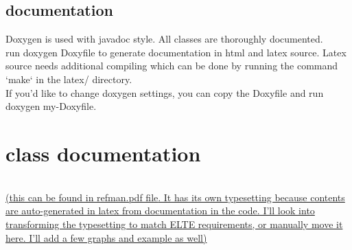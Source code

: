 \documentclass{elteikthesis}[2018/06/06]
\begin{document}
\subsection{documentation}
\label{sec-3-2-3}
Doxygen is used with javadoc style. All classes are thoroughly documented. \\
run doxygen Doxyfile to generate documentation in html and latex source. Latex source needs additional compiling which can be done by running the command `make` in the latex/ directory. \\
If you'd like to change doxygen settings, you can copy the Doxyfile and run doxygen my-Doxyfile. \\
\section{class documentation}
\label{sec-3-3}
\begin{center}
\begin{tabular}{}
\\
\\
\end{tabular}
\end{center}
\uline{(this can be found in \href{latex/refman.pdf}{refman.pdf file}. It has its own typesetting because contents are auto-generated in latex from documentation in the code. I'll look into transforming the typesetting to match ELTE requirements, or manually move it here. I'll add a few graphs and example as well)} \\
\begin{center}
\begin{tabular}{}
\\
\\
\end{tabular}
\end{center}
\end{document}
